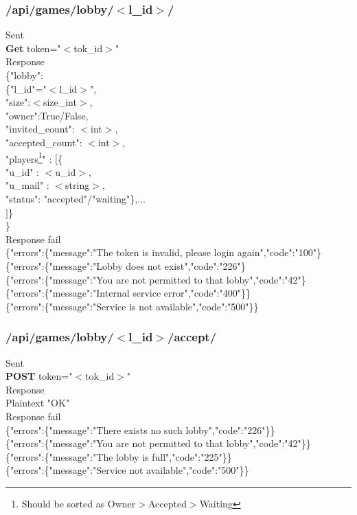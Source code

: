 \subsubsection{/api/games/lobby/$<$l\_id$>$/}
\tab	Sent \\
\tab\tab	\textbf{Get} token="$<$tok\_id$>$"\\
\tab	Response \\
\tab\tab	\{"lobby":\\
\tab\tab\tab	\{"l\_id"="$<$l\_id$>$", \\
\tab\tab\tab	"size":$<$size\_int$>$, \\
\tab\tab\tab	"owner":True/False, \\
\tab\tab\tab	"invited\_count": $<$int$>$,\\
\tab\tab\tab	"accepted\_count": $<$int$>$, \\
\tab\tab\tab	"players\footnote{Should be sorted as Owner$>$Accepted$>$Waiting}" : $[$\{\\
\tab\tab\tab\tab	"u\_id" : $<$u\_id$>$, \\
\tab\tab\tab\tab	"u\_mail" : $<$string$>$,\\
\tab\tab\tab\tab	"status": "accepted"/"waiting"\},...\\
\tab\tab\tab\tab	$]$\}\\
\tab\tab	\}\\
\tab	Response fail\\
\tab\tab	\{"errors":\{"message":"The token is invalid, please login again","code":"100"\}\\
\tab\tab	\{"errors":\{"message":"Lobby does not exist","code":"226"\}\\
\tab\tab	\{"errors":\{"message":"You are not permitted to that lobby","code":"42"\}\\
\tab\tab	\{"errors":\{"message":"Internal service error","code":"400"\}\}\\
\tab\tab	\{"errors":\{"message":"Service is not available","code":"500"\}\}    \\

\subsubsection{/api/games/lobby/$<$l\_id$>$/accept/}
\tab	Sent\\
\tab\tab	\textbf{POST} token="$<$tok\_id$>$"\\
\tab	Response\\
\tab\tab	Plaintext "OK"\\
\tab	Response fail\\
\tab\tab	\{"errors":\{"message":"There exists no such lobby","code":"226"\}\}\\
\tab\tab	\{"errors":\{"message":"You are not permitted to that lobby","code":"42"\}\}\\
\tab\tab	\{"errors":\{"message":"The lobby is full","code":"225"\}\}\\
\tab\tab	\{"errors":\{"message":"Service not available","code":"500"\}\}\\



